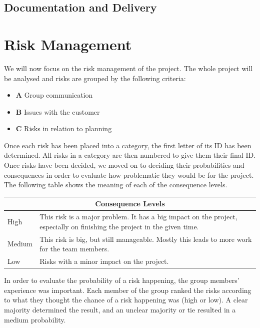 \subsection{Documentation and Delivery}
\label{subsec:PlanningProjPhasesDocDel}

\section{Risk Management}
\label{sec:PlanningRiskMan}
We will now focus on the risk management of the project. The whole project will be analysed and risks are grouped by the following criteria:
\begin{itemize}
\item \textbf{A} Group communication
\item \textbf{B} Issues with the customer
\item \textbf{C} Risks in relation to planning
\end{itemize}
Once each risk has been placed into a category, the first letter of its ID has been determined. All risks in a category are then numbered to give them their final ID. Once risks have been decided, we moved on to deciding their probabilities and consequences in order to evaluate how problematic they would be for the project. The following table shows the meaning of each of the consequence levels.

\begin{minipage}{\linewidth}
\setlength{\tabcolsep}{10pt}
\centering
{}
\begin{tabular}{ |l|p{5cm}| }
	\hline
	\multicolumn{2}{|c|}{\cellcolor{gray!25} Consequence Levels} \\
	\hline
	High & This risk is a major problem. It has a big impact on the project, especially on finishing the project in the given time.\\
	Medium & This risk is big, but still manageable. Mostly this leads to more work for the team members. \\
	Low & Risks with a minor impact on the project. \\
	\hline
\end{tabular}
\end{minipage}

In order to evaluate the probability of a risk happening, the group members' experience was important. Each member of the group ranked the risks according to what they thought the chance of a risk happening was (high or low). A clear majority determined the result, and an unclear majority or tie resulted in a medium probability.


